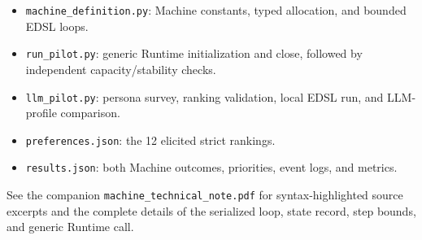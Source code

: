 \documentclass[11pt]{article}
\begin{document}
\begin{itemize}[leftmargin=*]
\item \texttt{machine\_definition.py}: Machine constants, typed allocation, and bounded EDSL loops.
\item \texttt{run\_pilot.py}: generic Runtime initialization and close, followed by independent capacity/stability checks.
\item \texttt{llm\_pilot.py}: persona survey, ranking validation, local EDSL run, and LLM-profile comparison.
\item \texttt{preferences.json}: the 12 elicited strict rankings.
\item \texttt{results.json}: both Machine outcomes, priorities, event logs, and metrics.
\end{itemize}

See the companion \texttt{machine\_technical\_note.pdf} for syntax-highlighted source excerpts and the complete details of the serialized loop, state record, step bounds, and generic Runtime call.
\end{document}
